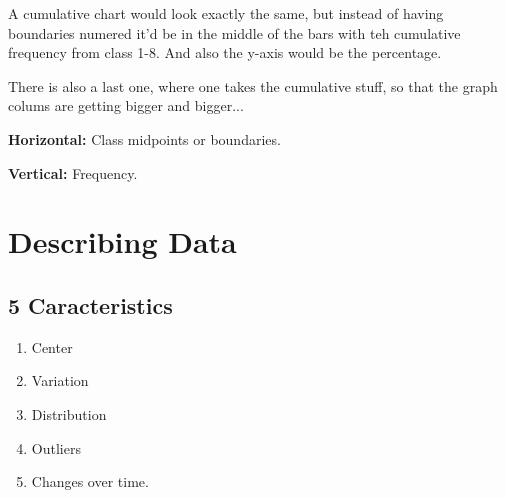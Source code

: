 \documentclass{book}
\begin{document}
A cumulative chart would look exactly the same, but instead of having
boundaries numered it'd be in the middle of the bars with teh cumulative
frequency from class 1-8. And also the y-axis would be the percentage.

There is also a last one, where one takes the cumulative stuff, so that the
graph colums are getting bigger and bigger...

\textbf{Horizontal:} Class midpoints or boundaries.

\textbf{Vertical:} Frequency.



\chapter{Describing Data}

\section{5 Caracteristics}

\begin{enumerate}
    \item Center
    \item Variation
    \item Distribution
    \item Outliers 
    \item Changes over time.
\end{enumerate}
\end{document}
